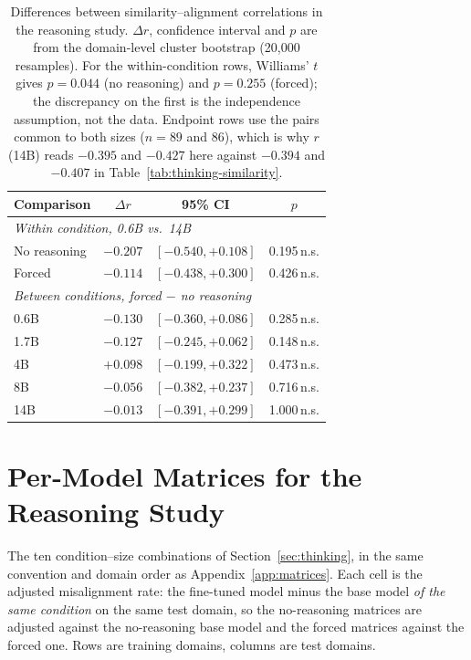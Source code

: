 \documentclass{article}
\begin{document}
\begin{table}[t]
\captionsetup{font=normalsize,skip=3pt}
\caption{Differences between similarity--alignment correlations in the reasoning study. $\Delta r$, confidence interval and $p$ are from the domain-level cluster bootstrap (20,000 resamples). For the within-condition rows, Williams' $t$ gives $p=0.044$ (no reasoning) and $p=0.255$ (forced); the discrepancy on the first is the independence assumption, not the data. Endpoint rows use the pairs common to both sizes ($n=89$ and $86$), which is why $r$(14B) reads $-0.395$ and $-0.427$ here against $-0.394$ and $-0.407$ in Table~\ref{tab:thinking-similarity}.}
\label{tab:endpoint-tests}
\centering
\scriptsize
\renewcommand{\arraystretch}{0.84}
\setlength{\tabcolsep}{1.5pt}
\begin{tabular}{lccc}
\toprule
\textbf{Comparison} & \textbf{$\Delta r$} & \textbf{95\% CI} & \textbf{$p$} \\
\midrule
\multicolumn{4}{l}{\emph{Within condition, 0.6B vs.\ 14B}} \\
No reasoning   & $-0.207$ & $[-0.540, +0.108]$ & 0.195\,n.s. \\
Forced         & $-0.114$ & $[-0.438, +0.300]$ & 0.426\,n.s. \\
\midrule
\multicolumn{4}{l}{\emph{Between conditions, forced $-$ no reasoning}} \\
0.6B & $-0.130$ & $[-0.360, +0.086]$ & 0.285\,n.s. \\
1.7B & $-0.127$ & $[-0.245, +0.062]$ & 0.148\,n.s. \\
4B   & $+0.098$ & $[-0.199, +0.322]$ & 0.473\,n.s. \\
8B   & $-0.056$ & $[-0.382, +0.237]$ & 0.716\,n.s. \\
14B  & $-0.013$ & $[-0.391, +0.299]$ & 1.000\,n.s. \\
\bottomrule
\end{tabular}
\end{table}

\section{Per-Model Matrices for the Reasoning Study}
\label{app:thinking-matrices}

The ten condition--size combinations of Section~\ref{sec:thinking}, in the same convention and domain order as Appendix~\ref{app:matrices}. Each cell is the adjusted misalignment rate: the fine-tuned model minus the base model \emph{of the same condition} on the same test domain, so the no-reasoning matrices are adjusted against the no-reasoning base model and the forced matrices against the forced one. Rows are training domains, columns are test domains.
\end{document}
